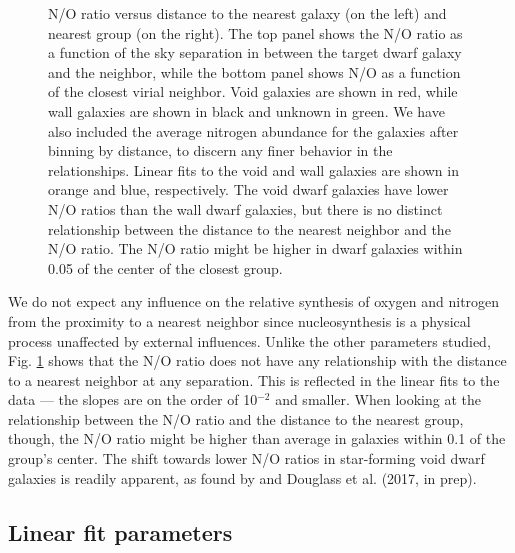 \begin{figure}
    \caption[N/O versus distance to nearest neighbor and group]{N/O ratio versus 
    distance to the nearest galaxy (on the left) and nearest group (on the 
    right).  The top panel shows the N/O ratio as a function of the sky 
    separation in \hMpc between the target dwarf galaxy and the neighbor, while 
    the bottom panel shows N/O as a function of the closest virial neighbor.  
    Void galaxies are shown in red, while wall galaxies are shown in black and 
    unknown in green.  We have also included the average nitrogen abundance for 
    the galaxies after binning by distance, to discern any finer behavior in the 
    relationships.  Linear fits to the void and wall galaxies are shown in 
    orange and blue, respectively.  The void dwarf galaxies have lower N/O 
    ratios than the wall dwarf galaxies, but there is no distinct relationship 
    between the distance to the nearest neighbor and the N/O ratio.  The N/O 
    ratio might be higher in dwarf galaxies within 0.05 \hMpc of the center of 
    the closest group.}
    \label{fig:NO}
\end{figure}

We do not expect any influence on the relative synthesis of oxygen and nitrogen 
from the proximity to a nearest neighbor since nucleosynthesis is a physical 
process unaffected by external influences.  Unlike the other parameters studied, 
Fig. \ref{fig:NO} shows that the N/O ratio does not have any relationship with 
the distance to a nearest neighbor at any separation.  This is reflected in the 
linear fits to the data --- the slopes are on the order of 10$^{-2}$ and 
smaller.  When looking at the relationship between the N/O ratio and the 
distance to the nearest group, though, the N/O ratio might be higher than 
average in galaxies within 0.1 \hMpc of the group's center.  The shift towards 
lower N/O ratios in star-forming void dwarf galaxies is readily apparent, as 
found by \cite{Douglass17b} and Douglass et al. (2017, in prep).


\subsection{Linear fit parameters}

